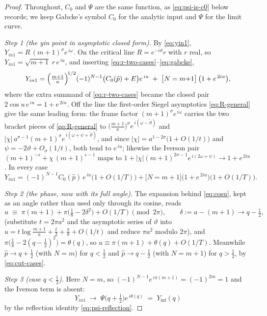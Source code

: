 \documentclass[11pt]{article}
\theoremstyle{definition}
\begin{document}
\begin{proof}
Throughout, $C_0$ and $\Psi$ are the same function, as
\eqref{eq:psi-is-c0} below records; we keep Gabcke's symbol $C_0$ for the
analytic input and $\Psi$ for the limit curve.

\emph{Step 1 (the yin point in asymptotic closed form).} By
\eqref{eq:yin1}, $Y_{in1}=R\,(m+1)^{\sigma}e^{\,i\omega}$. On the critical
line $R=e^{-i\vartheta}r$ with $r$ real, so
$Y_{in1}=\sqrt{m+1}\;r\,e^{\,iu}$, and inserting
\eqref{eq:r-two-cases}--\eqref{eq:gabcke},
\begin{equation}\label{eq:yin-asymp}
Y_{in1}
=\Bigl(\tfrac{m+1}{a}\Bigr)^{\!1/2}(-1)^{N-1}\bigl(C_0(\hat p)+E\bigr)
e^{\,iu}
\;+\;\bigl[N=m{+}1\bigr]\,\bigl(1+e^{\,2iu}\bigr),
\end{equation}
where the extra summand of \eqref{eq:r-two-cases} became the closed pair
$2\cos u\,e^{\,iu}=1+e^{\,2iu}$. Off the line the first-order Siegel
asymptotics \eqref{eq:R-general} give the same leading form: the frame
factor $(m+1)^{\sigma}e^{\,i\omega}$ carries the two bracket pieces of
\eqref{eq:R-general} to
$\bigl(\tfrac{m+1}{a}\bigr)^{\sigma}e^{\,i(\omega-\tilde\vartheta)}$ and
$|\chi|\,a^{\sigma-1}(m+1)^{\sigma}e^{\,i(\omega+\psi+\tilde\vartheta)}$,
and since $|\chi|=a^{1-2\sigma}\bigl(1+O(1/t)\bigr)$ and
$\psi=-2\vartheta+O_\sigma(1/t)$, both tend to $e^{\,iu}$; likewise the
Iverson pair $(m+1)^{-s}+\chi\,(m+1)^{s-1}$ maps to
$1+|\chi|(m+1)^{2\sigma-1}e^{\,i(2\omega+\psi)}\to1+e^{\,2iu}$. In every
case
\[
Y_{in1}=(-1)^{N-1}C_0(\hat p)\,e^{\,iu}\bigl(1+O(1/T)\bigr)
+\bigl[N=m{+}1\bigr]\bigl(1+e^{\,2iu}\bigr)\bigl(1+O(1/T)\bigr).
\]

\emph{Step 2 (the phase, now with its full angle).} The expansion behind
\eqref{eq:cosu}, kept as an angle rather than used only through its cosine,
reads
\[
u\;\equiv\;\pi(m+1)+\pi\bigl(\tfrac18-2\delta^{2}\bigr)+O(1/T)
\pmod{2\pi},
\qquad \delta:=a-(m+1)\longrightarrow q-\tfrac12,
\]
(substitute $t=2\pi a^{2}$ and the asymptotic series of $\vartheta$ into
$u=t\log\tfrac{m+1}{a}+\tfrac t2+\tfrac\pi8+O(1/t)$ and reduce
$\pi a^{2}$ modulo $2\pi$), and
$\pi\bigl(\tfrac18-2(q-\tfrac12)^{2}\bigr)=\theta(q)$, so
$u\equiv\pi(m+1)+\theta(q)+O(1/T)$. Meanwhile
$\hat p\to q+\tfrac12$ (with $N=m$) for $q<\tfrac12$ and
$\hat p\to q-\tfrac12$ (with $N=m+1$) for $q>\tfrac12$, by
\eqref{eq:cut-cases}.

\emph{Step 3 (case $q<\tfrac12$).} Here $N=m$, so
$(-1)^{N-1}e^{\,i\pi(m+1)}=(-1)^{2m}=1$ and the Iverson term is absent:
\[
Y_{in1}\;\longrightarrow\;\Psi\bigl(q+\tfrac12\bigr)e^{\,i\theta(q)}
\;=\;Y_{\inf}(q)
\]
by the reflection identity \eqref{eq:psi-reflection}.


\end{proof}
\end{document}
